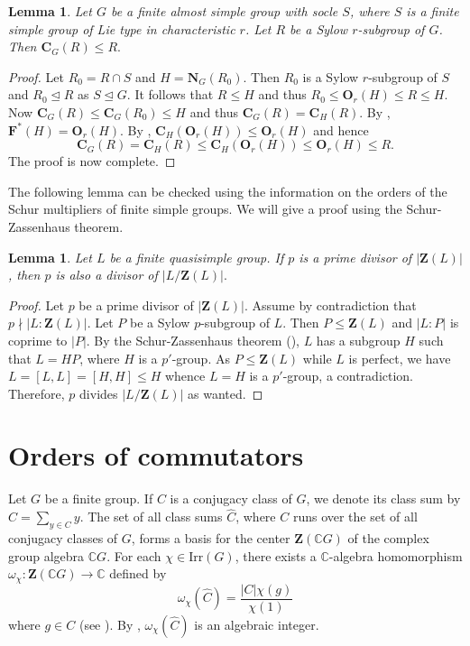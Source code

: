 \documentclass[twoside,a4paper,reqno,12pt]{amsart}
\newcommand{\<}{\langle}
\renewcommand{\>}{\rangle}
\newcommand{\leqs}{\leqslant}
\newcommand{\OB}{\mathbf{O}}
\newcommand{\CB}{\mathbf{C}}
\newcommand{\FB}{\mathbf{F}}
\newcommand{\NB}{\mathbf{N}}
\newcommand{\ZB}{\mathbf{Z}}
\newcommand{\Irr}{\mathrm {Irr}}
\renewcommand{\leq}{\leqs}
\renewcommand{\:}{\colon}
\newtheorem{lem}[thm]{Lemma}
\theoremstyle{definition}
\begin{document}
 \begin{lem}\label{lem:Sylow-centralizers}
 Let $G$ be a finite almost simple group with socle $S$, where $S$ is  a finite simple group of Lie type in characteristic $r$.  Let $R$ be a Sylow $r$-subgroup of $G$. Then $\CB_G(R)\leq R.$ 
 \end{lem}
 
 \begin{proof} Let $R_0=R\cap S$ and $H=\NB_G(R_0)$. Then $R_0$ is a Sylow $r$-subgroup of $S$ and $R_0\unlhd R$ as $S\unlhd G$. It follows that $R\leq H$ and thus $R_0\leq \OB_r(H)\leq R\leq  H$. Now $\CB_G(R)\leq \CB_G(R_0)\leq H$ and thus $\CB_G(R)=\CB_H(R).$ By \cite[Corollary 3.1.4]{GLS3}, $\FB^*(H)=\OB_r(H)$. By  \cite[31.13]{Aschbacher}, $\CB_H(\OB_r(H))\leq \OB_r(H)$ and hence $$\CB_G(R)=\CB_H(R)\leq \CB_H(\OB_r(H))\leq \OB_r(H)\leq R.$$
 The proof is now complete.
 \end{proof}
 
 
 The following lemma can be checked using the information on the orders of the Schur multipliers of finite simple groups.  We will give a proof using the Schur-Zassenhaus theorem.
 \begin{lem}\label{lem:center-quasisimple}
 Let $L$ be a finite quasisimple group. If $p$ is a prime divisor of $|\ZB(L)|$, then $p$ is also a divisor of $|L/\ZB(L)|.$ 
 \end{lem}
 
 \begin{proof} Let $p$ be a prime divisor of $|\ZB(L)|$.
 Assume by contradiction that $p\nmid |L:\ZB(L)|$. Let $P$ be a Sylow $p$-subgroup of $L$. Then $P\leq \ZB(L)$ and $|L:P|$ is coprime to $|P|$. By the Schur-Zassenhaus theorem (\cite[Theorem 18.1]{Aschbacher}), $L$ has a subgroup $H$ such that $L=HP$, where $H$ is a $p'$-group. As $P\leq \ZB(L)$ while $L$ is perfect, we have $L=[L,L]=[H,H]\leq H$ whence  $L=H$ is a $p'$-group, a contradiction. Therefore, $p$ divides $|L/\ZB(L)|$ as wanted.
 \end{proof}
\section{Orders of commutators}\label{sec3}

Let $G$ be a finite group. If $C$ is a conjugacy class of $G$, we denote  its class sum by $\widehat{C}=\sum_{y\in C}y$. The set of all class sums $\widehat{C}$, where $C$ runs over the set of all conjugacy classes of $G$, forms a basis for the center $\ZB(\mathbb{C} G)$ of the complex group algebra $\mathbb{C} G$. For each $\chi\in\Irr(G)$, there exists a  $\mathbb{C}$-algebra homomorphism $\omega_\chi:\ZB(\mathbb{C} G)\rightarrow \mathbb{C}$ defined  by $$\omega_\chi(\widehat{C})=\frac{|C|\chi(g)}{\chi(1)}$$ where $g\in C$ (see \cite[Chapter 3]{Isaacs-ct}).   By \cite[Theorem 3.7]{Isaacs-ct}, $\omega_\chi(\widehat{C})$ is an algebraic integer.
\end{document}
